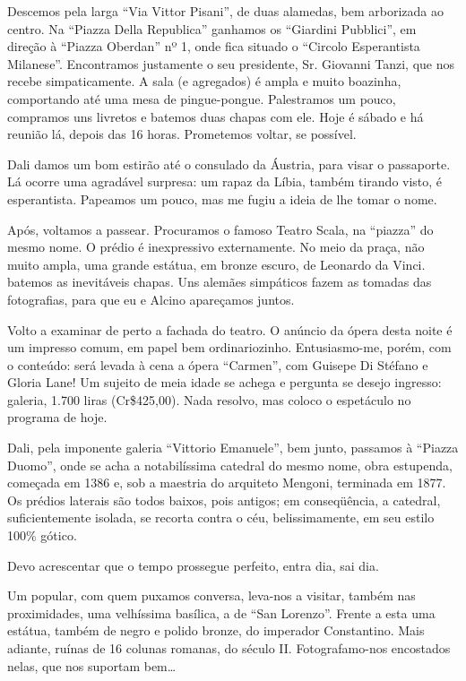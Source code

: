 Descemos pela larga ``Via Vittor Pisani'', de duas alamedas, bem arborizada ao centro. Na ``Piazza Della Republica'' ganhamos os ``Giardini Pubblici'', em direção à ``Piazza Oberdan'' nº 1, onde fica situado o ``Circolo Esperantista Milanese''. Encontramos justamente o seu presidente, Sr. Giovanni Tanzi, que nos recebe simpaticamente. A sala (e agregados) é ampla e muito boazinha, comportando até uma mesa de pingue-pongue. Palestramos um pouco, compramos uns livretos e batemos duas chapas com ele. Hoje é sábado e há reunião lá, depois das 16 horas. Prometemos voltar, se possível.

Dali damos um bom estirão até o consulado da Áustria, para visar o passaporte. Lá ocorre uma agradável surpresa: um rapaz da Líbia, também tirando visto, é esperantista. Papeamos um pouco, mas me fugiu a ideia de lhe tomar o nome.

Após, voltamos a passear. Procuramos o famoso Teatro Scala, na ``piazza'' do mesmo nome. O prédio é inexpressivo externamente. No meio da praça, não muito ampla, uma grande estátua, em bronze escuro, de Leonardo da Vinci. batemos as inevitáveis chapas. Uns alemães simpáticos fazem as tomadas das fotografias, para que eu e Alcino apareçamos juntos.

Volto a examinar de perto a fachada do teatro. O anúncio da ópera desta noite é um impresso comum, em papel bem ordinariozinho. Entusiasmo-me, porém, com o conteúdo: será levada à cena a ópera ``Carmen'', com Guisepe Di Stéfano e Gloria Lane! Um sujeito de meia idade se achega e pergunta se desejo ingresso: galeria, 1.700 liras (Cr\$425,00). Nada resolvo, mas coloco o espetáculo no programa de hoje.

Dali, pela imponente galeria ``Vittorio Emanuele'', bem junto, passamos à ``Piazza Duomo'', onde se acha a notabilíssima catedral do mesmo nome, obra estupenda, começada em 1386 e, sob a maestria do arquiteto Mengoni, terminada em 1877. Os prédios laterais são todos baixos, pois antigos; em conseqüência, a catedral, suficientemente isolada, se recorta contra o céu, belissimamente, em seu estilo 100\% gótico.

Devo acrescentar que o tempo prossegue perfeito, entra dia, sai dia.

Um popular, com quem puxamos conversa, leva-nos a visitar, também nas proximidades, uma velhíssima basílica, a de ``San Lorenzo''. Frente a esta uma estátua, também de negro e polido bronze, do imperador Constantino. Mais adiante, ruínas de 16 colunas romanas, do século II. Fotografamo-nos encostados nelas, que nos suportam bem\ldots


